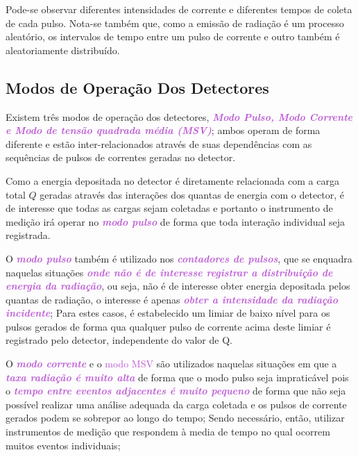 \documentclass[11pt,a4paper]{article}
\begin{document}
	\noindent Pode-se observar diferentes intensidades de corrente e diferentes tempos de coleta de cada pulso. Nota-se também que, como a emissão de radiação é um processo aleatório, os intervalos de tempo entre um pulso de corrente e outro também é aleatoriamente distribuído. 
      
	\subsection*{Modos de Operação Dos Detectores}

		Existem três modos de operação dos detectores, \textcolor{MediumOrchid}{\textbf{\textit{Modo Pulso, Modo Corrente e Modo de tensão quadrada média (MSV)}}}; ambos operam de forma diferente e estão inter-relacionados através de suas dependências com as sequências de pulsos de correntes geradas no detector. 

		Como a energia depositada no detector é diretamente relacionada com a carga total $Q$ geradas através das interações dos quantas de energia com o detector, é de interesse que todas as cargas sejam coletadas e portanto o instrumento de medição irá operar no \textcolor{MediumOrchid}{\textit{\textbf{modo pulso}}} de forma que toda interação individual seja registrada. 

		O \textcolor{MediumOrchid}{\textit{\textbf{modo pulso}}} também é utilizado nos \textcolor{MediumOrchid}{\textit{\textbf{contadores de pulsos}}}, que se enquadra naquelas situações \textcolor{MediumOrchid}{\textit{\textbf{onde não é de interesse registrar a distribuição de energia da radiação}}}, ou seja, não é de interesse obter energia depositada pelos quantas de radiação, o interesse é apenas \textcolor{MediumOrchid}{\textit{\textbf{obter a intensidade da radiação incidente}}}; Para estes casos, é estabelecido um limiar de baixo nível para os pulsos gerados de forma qua qualquer pulso de corrente acima deste limiar é registrado pelo detector, independente do valor de Q.

		O \textcolor{MediumOrchid}{\textit{\textbf{modo corrente}}} e o \textcolor{MediumOrchid}{modo MSV} são utilizados naquelas situações em que a \textcolor{MediumOrchid}{\textit{\textbf{taxa radiação é muito alta}}} de forma que o modo pulso seja impraticável pois o \textcolor{MediumOrchid}{\textit{\textbf{tempo entre eventos adjacentes é muito pequeno}}} de forma que não seja possível realizar uma análise adequada da carga coletada e os pulsos de corrente gerados podem se sobrepor ao longo do tempo; Sendo necessário, então, utilizar instrumentos de medição que respondem à media de tempo no qual ocorrem muitos eventos individuais;
\end{document}
